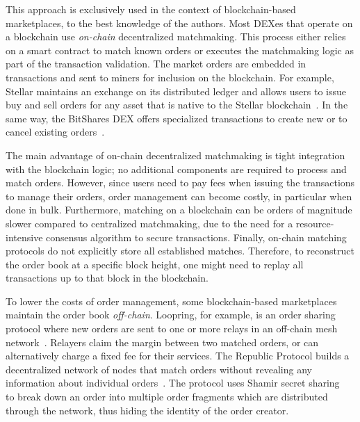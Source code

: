 This approach is exclusively used in the context of blockchain-based marketplaces, to the best knowledge of the authors.
Most DEXes that operate on a blockchain use \emph{on-chain} decentralized matchmaking.
This process either relies on a smart contract to match known orders or executes the matchmaking logic as part of the transaction validation.
The market orders are embedded in transactions and sent to miners for inclusion on the blockchain.
For example, Stellar maintains an exchange on its distributed ledger and allows users to issue buy and sell orders for any asset that is native to the Stellar blockchain~\cite{lokhava2019fast}.
In the same way, the BitShares DEX offers specialized transactions to create new or to cancel existing orders~\cite{schuh2015bitshares}.

The main advantage of on-chain decentralized matchmaking is tight integration with the blockchain logic; no additional components are required to process and match orders.
However, since users need to pay fees when issuing the transactions to manage their orders, order management can become costly, in particular when done in bulk.
Furthermore, matching on a blockchain can be orders of magnitude slower compared to centralized matchmaking, due to the need for a resource-intensive consensus algorithm to secure transactions.
Finally, on-chain matching protocols do not explicitly store all established matches.
Therefore, to reconstruct the order book at a specific block height, one might need to replay all transactions up to that block in the blockchain.

To lower the costs of order management, some blockchain-based marketplaces maintain the order book \emph{off-chain}.
Loopring, for example, is an order sharing protocol where new orders are sent to one or more relays in an off-chain mesh network~\cite{loopring}.
Relayers claim the margin between two matched orders, or can alternatively charge a fixed fee for their services.
The Republic Protocol builds a decentralized network of nodes that match orders without revealing any information about individual orders~\cite{zhang2017republic}.
The protocol uses Shamir secret sharing~\cite{shamir1979share} to break down an order into multiple order fragments which are distributed through the network, thus hiding the identity of the order creator.

